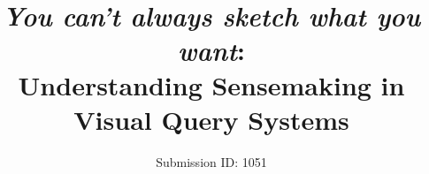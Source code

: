 \documentclass{egpubl}
\begin{document}
\title[You can't always sketch what you want: Understanding Sensemaking in Visual Query Systems]{\emph{You can't always sketch what you want}: \\ Understanding Sensemaking in Visual Query Systems\vspace{-20pt}}
\author{Submission ID: 1051\vspace{-50pt}}
\maketitle
\end{document}
